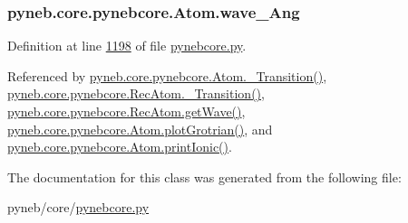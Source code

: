 \subsubsection[{wave\+\_\+\+Ang}]{\setlength{\rightskip}{0pt plus 5cm}pyneb.\+core.\+pynebcore.\+Atom.\+wave\+\_\+\+Ang}\label{classpyneb_1_1core_1_1pynebcore_1_1_atom_a044e1349bb63766a5f3d25fbf04b5c2c}


Definition at line \hyperlink{pynebcore_8py_source_l01198}{1198} of file \hyperlink{pynebcore_8py_source}{pynebcore.\+py}.



Referenced by \hyperlink{pynebcore_8py_source_l01367}{pyneb.\+core.\+pynebcore.\+Atom.\+\_\+\+Transition()}, \hyperlink{pynebcore_8py_source_l02696}{pyneb.\+core.\+pynebcore.\+Rec\+Atom.\+\_\+\+Transition()}, \hyperlink{pynebcore_8py_source_l02623}{pyneb.\+core.\+pynebcore.\+Rec\+Atom.\+get\+Wave()}, \hyperlink{pynebcore_8py_source_l02372}{pyneb.\+core.\+pynebcore.\+Atom.\+plot\+Grotrian()}, and \hyperlink{pynebcore_8py_source_l02167}{pyneb.\+core.\+pynebcore.\+Atom.\+print\+Ionic()}.



The documentation for this class was generated from the following file\+:\begin{DoxyCompactItemize}
\item 
pyneb/core/\hyperlink{pynebcore_8py}{pynebcore.\+py}\end{DoxyCompactItemize}
